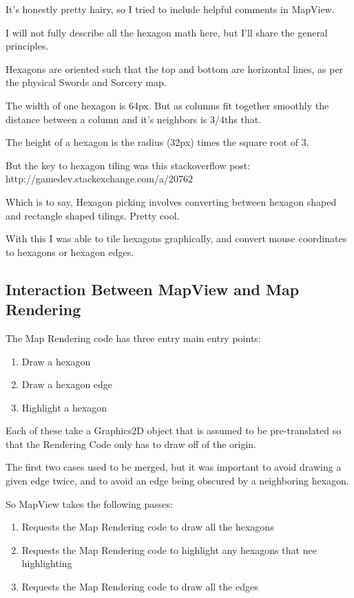 \documentclass[12pt,a4paper]{article}
\begin{document}
It's honestly pretty hairy, so I tried to include helpful comments in
MapView.

I will not fully describe all the hexagon math here, but I'll share the general
principles.

Hexagons are oriented such that the top and bottom are horizontal lines,
as per the physical Swords and Sorcery map.

The width of one hexagon is 64px. But as columns fit together
smoothly the distance between a column and it's neighbors is 3/4ths that.

The height of a hexagon is the radius (32px) times the square root of 3.

But the key to hexagon tiling was this stackoverflow post:
http://gamedev.stackexchange.com/a/20762 

Which is to say, Hexagon picking involves converting between hexagon shaped
and rectangle shaped tilings. Pretty cool.

With this I was able to tile hexagons graphically, and convert mouse coordinates
to hexagons or hexagon edges.

\subsection{Interaction Between MapView and Map Rendering}

The Map Rendering code has three entry main entry points:
\begin{enumerate}
\item{Draw a hexagon}
\item{Draw a hexagon edge}
\item{Highlight a hexagon}
\end{enumerate}

Each of these take a Graphics2D object that is assumed to be pre-translated so
that the Rendering Code only has to draw off of the origin.

The first two cases used to be merged, but it was important to avoid drawing a
given edge twice, and to avoid an edge being obscured by a neighboring hexagon.

So MapView takes the following passes:
\begin{enumerate}
\item{Requests the Map Rendering code to draw all the hexagons}
\item{Requests the Map Rendering code to highlight any hexagons that nee
      highlighting}
\item{Requests the Map Rendering code to draw all the edges}
\end{enumerate}
\end{document}
